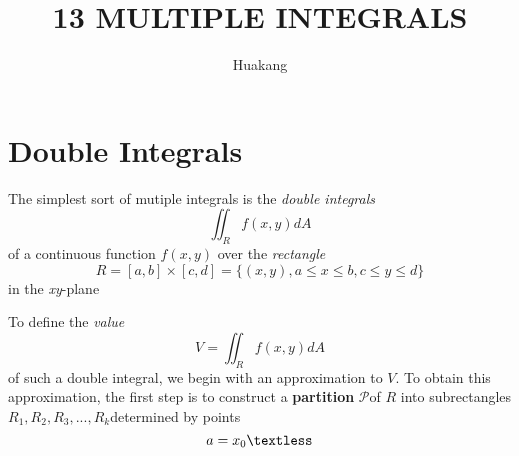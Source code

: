 \documentclass{article}
\title{13 MULTIPLE INTEGRALS}
\author{Huakang}
\begin{document}
    \maketitle
    \section{Double Integrals}
    The simplest sort of mutiple integrals is the \textit{double integrals}
    $$\iint _R f(x,y)dA$$
    of a continuous function $f(x,y)$ over the \textit{rectangle}
    $$R=[a,b]\times[c,d]=\{(x,y),a\leq x\leq b,c\leq y\leq d\}$$
    in the \textit{xy}-plane

    To define the \textit{value}
    $$V=\iint_R f(x,y)dA$$
    of such a double integral, we begin with an approximation to $V$. 
    To obtain this approximation, the first step is to construct a 
    \textbf{partition} $\mathcal{P}$of $R$ into subrectangles 
    $R_1,R_2,R_3,...,R_k$determined by points
    $$a=x_0\textless $$
\end{document}
